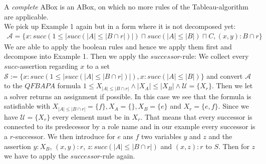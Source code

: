 \documentclass[a4paper,11pt]{scrartcl}
\theoremstyle{break}
\theoremstyle{definition}
\begin{document}
A \textit{complete} ABox is an ABox, on which no more rules of the Tableau-algorithm are applicable.\\
We pick up Example 1 again but in a form where it is not decomposed yet:
\begin{align*}
\mathcal{A}=\{x:succ(1\leq|succ(|A|\leq|B\cap r|)|)\sqcap succ(|A|\leq |B|)\sqcap C, (x,y):B\cap r\}
\end{align*}
We are able to apply the boolean rules and hence we apply them first and decompose into Example 1. Then we apply the $successor$-rule: We collect every $succ$-assertion regarding $x$ to a set $\mathcal{S}:=\{x:succ(1\leq|succ(|A|\leq|B\cap r|)|), x:succ(|A|\leq |B|)\}$ and convert $\mathcal{A}$ to the $QFBAPA$ formula $1\leq X_{|A|\leq|B\cap r|}\wedge|X_A|\leq |X_B|\wedge \mathcal{U}=\{X_r\}$. Then we let a solver returns an assignment if possible. In this case we see that the formula is satisfiable with $X_{|A|\leq|B\cap r|}=\{f\},X_A=\{\},X_B=\{e\}$ and $X_r=\{e,f\}$. Since we have $\mathcal{U}=\{X_r\}$ every element must be in $X_r$. That means that every successor is connected to its predecessor by a role name and in our example every successor is a $r$-successor. We then introduce for $e$ ans $f$ two variables $y$ and $z$ and the assertion $y:X_B$, $(x,y):r$, $z:succ(|A|\leq|B\cap r|)$ and $(x,z):r$ to $S$. Then for $z$ we have to apply the $successor$-rule again.
\end{document}
